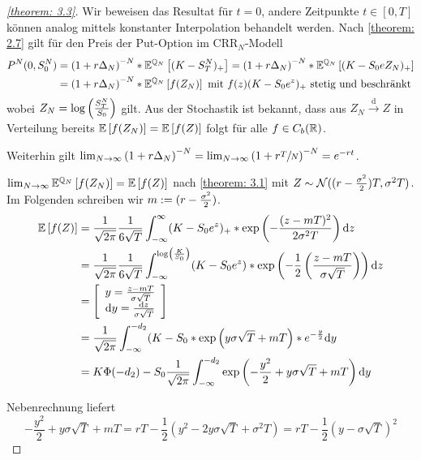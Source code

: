 \begin{proof}[\cref{theorem: 3.3}]	
	Wir beweisen das Resultat für $t = 0$, andere Zeitpunkte $t \in [0,T]$ können analog mittels konstanter Interpolation behandelt werden. Nach \cref{theorem: 2.7} gilt für den Preis der Put-Option im CRR${}_N$-Modell 
	\begin{align*}
		P^N(0,S_0^N) &= \left( 1 + r \Delta_N \right)^{-N} * \mathbb{E}^{\mathbb{Q}_N}\left[ (K- S_T^N)_+ \right] 
		= \left( 1 + r \Delta_N \right)^{-N} *  \mathbb{E}^{\mathbb{Q}_N}\left[ (K- S_0 e	{Z_N})_+ \right] \\
		&= \left( 1 + r \Delta_N \right)^{-N} * \mathbb{E}^{\mathbb{Q}_N}\left[ f(Z_N) \right] \text{ mit } f(z) (K - S_0 e^z)_+ \text{ stetig und beschränkt }
	\end{align*}
	wobei $Z_N = \log\left( \frac{S_T^N}{S_0} \right)$ gilt. Aus der Stochastik ist bekannt, dass aus $Z_N \overset{\mathrm{d}}{\to} Z$ in Verteilung bereits $\mathbb{E} \left[ f(Z_N) \right] = \mathbb{E} \left[ f(Z) \right]$ folgt für alle $f \in C_b(\mathbb{R})$.
	
	Weiterhin gilt $\lim_{N \to \infty} \left( 1 + r \Delta_N \right)^{-N} = \lim_{N \to \infty} \left( 1 + r \sfrac{T}{N} \right)^{-N} = e^{-r t}$.
	
	$\lim_{N \to \infty} \mathbb{E}^{\mathbb{Q}_N}\left[ f(Z_N) \right] = \mathbb{E} \left[ f(Z) \right]$ nach \cref{theorem: 3.1} mit $Z \sim \mathcal{N}((r-\frac{\sigma^2}{2})T , \sigma^2 T)$. Im Folgenden schreiben wir $m \mathrel{:=} (r-\frac{\sigma^2}{2})$. 
	\begin{align*}
		\mathbb{E} \left[ f(Z) \right] &= \frac{1}{\sqrt{2 \pi}} \frac{1}{6 \sqrt{T}}  \int_{-\infty}^\infty (K - S_0 e^z)_+ * \exp \left( - \frac{(z - mT)^2}{2 \sigma^2 T} \right) \mathrm{d}{z} \\
		&= \frac{1}{\sqrt{2 \pi}}  \frac{1}{6 \sqrt{T}} \int_{-\infty}^{\log\left( \frac{K}{S_0} \right)} (K - S_0 e^z) * \exp \left( - \frac{1}{2} \left( \frac{z - mT}{ \sigma \sqrt{T}} \right) \right) \mathrm{d}{z} \\
		&= \left[  \begin{array}{c}
			y = \frac{z - m T}{\sigma \sqrt{T}} \\
			\mathrm{d} y = \frac{\mathrm{d} z}{\sigma \sqrt{T}}
			\end{array}  \right] \\
		&= \frac{1}{\sqrt{2 \pi}}  \int_{-\infty}^{-d_2} (K - S_0  * \exp \left( y \sigma \sqrt{T} + mT \right) * e^{-\frac{y}{2}} \mathrm{d}{y} \\
		&= K \Phi(-d_2) - S_0 \frac{1}{\sqrt{2\pi}} \int_{-\infty}^{-d_2} \exp \left( - \frac{y^2}{2} + y \sigma \sqrt{T} + mT \right) \mathrm{d}{y} 
	\end{align*}
	
	Nebenrechnung liefert
	\begin{equation*}
		-\frac{y^2}{2} + y \sigma \sqrt{T} + mT = rT - \frac{1}{2} (y^2 - 2y \sigma \sqrt{T} + \sigma^2 T) = rT - \frac{1}{2} (y - \sigma\sqrt{T})^2
	\end{equation*}
	

\end{proof}
